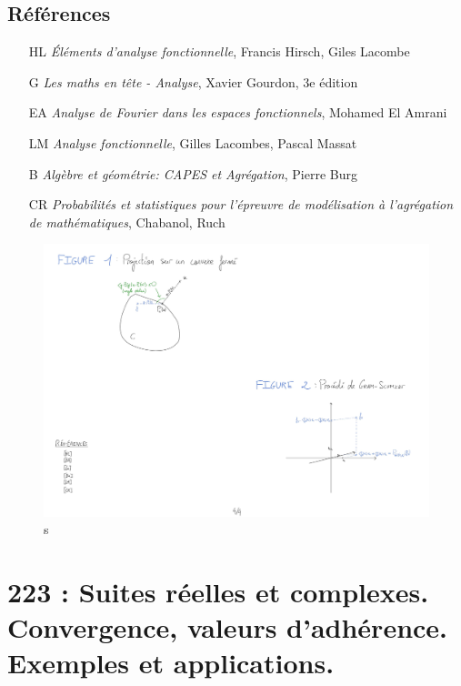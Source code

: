 \documentclass[10pt, a4paper, parskip=full, twoside, twocolumn]{report}
\begin{document}
\section*{Références}
\begin{itemize}
	\item[HL] \emph{Éléments d'analyse fonctionnelle}, Francis Hirsch, Giles Lacombe
	\item[G] \emph{Les maths en tête - Analyse}, Xavier Gourdon, 3e édition 
	\item[EA] \emph{Analyse de Fourier dans les espaces fonctionnels}, Mohamed El Amrani
	\item[LM] \emph{Analyse fonctionnelle}, Gilles Lacombes, Pascal Massat
	\item[B] \emph{Algèbre et géométrie: CAPES et Agrégation}, Pierre Burg
	\item[CR] \emph{Probabilités et statistiques pour l'épreuvre de modélisation à l'agrégation de mathématiques}, Chabanol, Ruch
\end{itemize}
\begin{figure}[!htb]
	\centering
	\includegraphics[trim={0 0 0 0},clip,width=1\linewidth]{img/213.pdf}
	\caption{s}
\end{figure}

\chapter*{223 : Suites réelles et complexes. Convergence, valeurs d’adhérence. Exemples et applications.}
\setcounter{definition}{0}
\end{document}
